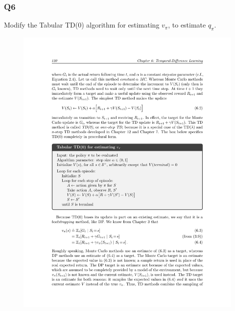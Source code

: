 \documentclass[a4paper, 10pt]{article}
\begin{document}
\subsubsection*{Q6}
Modify the Tabular TD(0) algorithm for estimating $v_\pi$, to estimate $q_\pi$.
\begin{figure}[h!]
  \center
\includegraphics[width=0.85\linewidth]{figures/c2m2_td_alg.pdf}
\end{figure}
\end{document}
